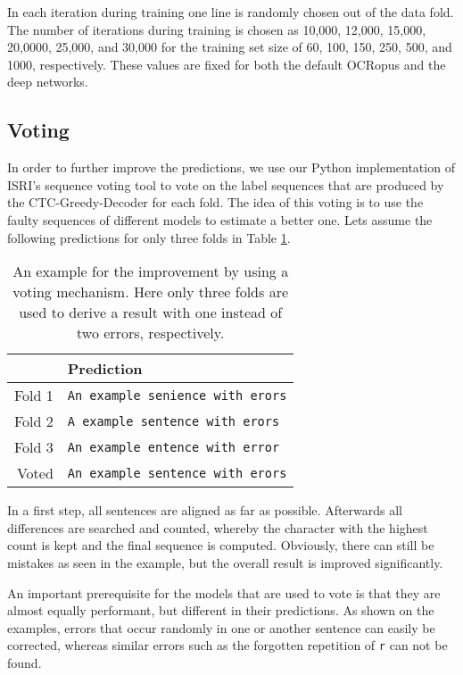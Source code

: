 \documentclass{jlcl}
\begin{document}
In each iteration during training one line is randomly chosen out of the data fold.
The number of iterations during training is chosen as 10,000, 12,000, 15,000, 20,0000, 25,000, and 30,000 for the training set size of 60, 100, 150, 250, 500, and 1000, respectively.
These values are fixed for both the default OCRopus and the deep networks.


\subsection{Voting}
\label{sec:voting}
In order to further improve the predictions, we use our Python implementation of ISRI's sequence voting tool to vote on the label sequences that are produced by the CTC-Greedy-Decoder for each fold.
The idea of this voting is to use the faulty sequences of different models to estimate a better one.
Lets assume the following predictions for only three folds in Table \ref{tab:example_voting}.
\begin{table}[t]
    \centering
    \caption{An example for the improvement by using a voting mechanism. Here only three folds are used to derive a result with one instead of two errors, respectively.}
    \label{tab:example_voting}
    \begin{tabular}{rl}
        \hline
               & \textbf{Prediction} \\
        \hline
        Fold 1 & \texttt{An example senience with erors} \\
        Fold 2 & \texttt{A example sentence with erors} \\
        Fold 3 & \texttt{An example entence with error} \\
        \hline 
        Voted & \texttt{An example sentence with erors} \\
        \hline
    \end{tabular}
\end{table}
In a first step, all sentences are aligned as far as possible.
Afterwards all differences are searched and counted, whereby the character with the highest count is kept and the final sequence is computed.
Obviously, there can still be mistakes as seen in the example, but the overall result is improved significantly.

An important prerequisite for the models that are used to vote is that they are almost equally performant, but different in their predictions.
As shown on the examples, errors that occur randomly in one or another sentence can easily be corrected, whereas similar errors such as the forgotten repetition of \texttt{r} can not be found.
\end{document}
